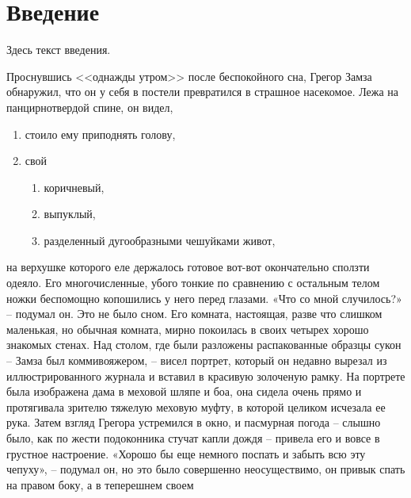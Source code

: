
\newcommand{\No}{\textnumero}







\maketitle

\tableofcontents

\section*{Введение}
Здесь текст введения.

Проснувшись <<однажды утром>> после беспокойного сна, Грегор Замза обнаружил, что он у себя в постели превратился в страшное насекомое. 
Лежа на панцирнотвердой спине, он видел,

\begin{enumerate}
   \item стоило ему приподнять голову, 
   \item свой 
   \begin{enumerate}
      \item коричневый, 
      \item выпуклый, 
      \item разделенный дугообразными чешуйками живот, 
   \end{enumerate}
   
   
   
\end{enumerate}

на верхушке которого еле держалось готовое вот-вот окончательно сползти одеяло. Его многочисленные, убого тонкие по сравнению с остальным телом ножки беспомощно копошились у него перед глазами. «Что со мной случилось?» – подумал он. Это не было сном. Его комната, настоящая, разве что слишком маленькая, но обычная комната, мирно покоилась в своих четырех хорошо знакомых стенах. Над столом, где были разложены распакованные образцы сукон – Замза был коммивояжером, – висел портрет, который он недавно вырезал из иллюстрированного журнала и вставил в красивую золоченую рамку. На портрете была изображена дама в меховой шляпе и боа, она сидела очень прямо и протягивала зрителю тяжелую меховую муфту, в которой целиком исчезала ее рука. Затем взгляд Грегора устремился в окно, и пасмурная погода – слышно было, как по жести подоконника стучат капли дождя – привела его и вовсе в грустное настроение. «Хорошо бы еще немного поспать и забыть всю эту чепуху», – подумал он, но это было совершенно неосуществимо, он привык спать на правом боку, а в теперешнем своем





